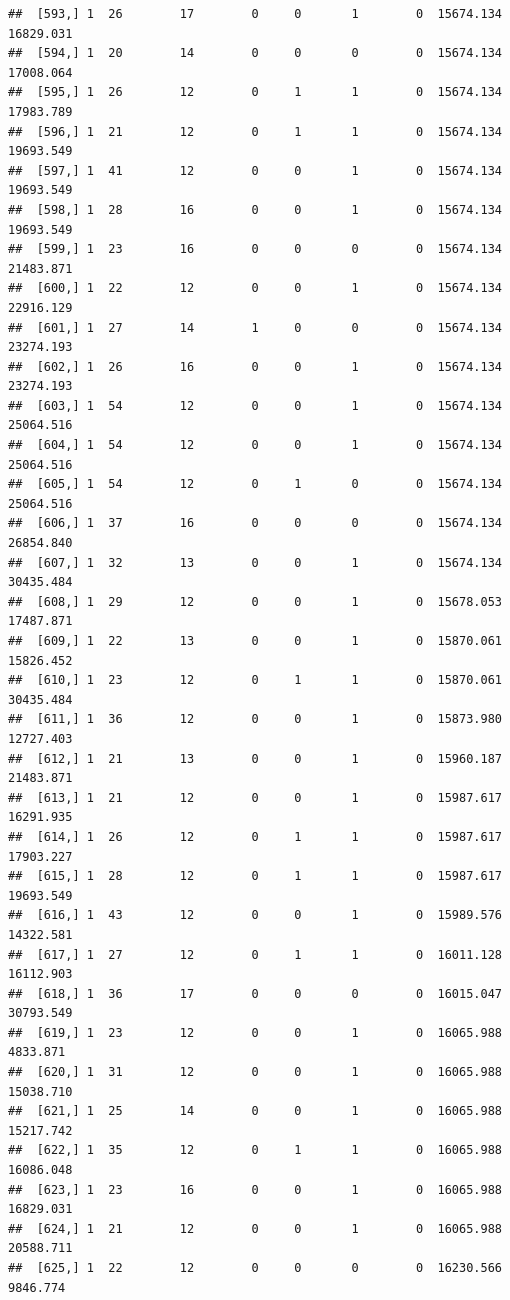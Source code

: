 \documentclass[
]{article}
\begin{document}
\begin{verbatim}
##  [593,] 1  26        17        0     0       1        0  15674.134  16829.031
##  [594,] 1  20        14        0     0       0        0  15674.134  17008.064
##  [595,] 1  26        12        0     1       1        0  15674.134  17983.789
##  [596,] 1  21        12        0     1       1        0  15674.134  19693.549
##  [597,] 1  41        12        0     0       1        0  15674.134  19693.549
##  [598,] 1  28        16        0     0       1        0  15674.134  19693.549
##  [599,] 1  23        16        0     0       0        0  15674.134  21483.871
##  [600,] 1  22        12        0     0       1        0  15674.134  22916.129
##  [601,] 1  27        14        1     0       0        0  15674.134  23274.193
##  [602,] 1  26        16        0     0       1        0  15674.134  23274.193
##  [603,] 1  54        12        0     0       1        0  15674.134  25064.516
##  [604,] 1  54        12        0     0       1        0  15674.134  25064.516
##  [605,] 1  54        12        0     1       0        0  15674.134  25064.516
##  [606,] 1  37        16        0     0       0        0  15674.134  26854.840
##  [607,] 1  32        13        0     0       1        0  15674.134  30435.484
##  [608,] 1  29        12        0     0       1        0  15678.053  17487.871
##  [609,] 1  22        13        0     0       1        0  15870.061  15826.452
##  [610,] 1  23        12        0     1       1        0  15870.061  30435.484
##  [611,] 1  36        12        0     0       1        0  15873.980  12727.403
##  [612,] 1  21        13        0     0       1        0  15960.187  21483.871
##  [613,] 1  21        12        0     0       1        0  15987.617  16291.935
##  [614,] 1  26        12        0     1       1        0  15987.617  17903.227
##  [615,] 1  28        12        0     1       1        0  15987.617  19693.549
##  [616,] 1  43        12        0     0       1        0  15989.576  14322.581
##  [617,] 1  27        12        0     1       1        0  16011.128  16112.903
##  [618,] 1  36        17        0     0       0        0  16015.047  30793.549
##  [619,] 1  23        12        0     0       1        0  16065.988   4833.871
##  [620,] 1  31        12        0     0       1        0  16065.988  15038.710
##  [621,] 1  25        14        0     0       1        0  16065.988  15217.742
##  [622,] 1  35        12        0     1       1        0  16065.988  16086.048
##  [623,] 1  23        16        0     0       1        0  16065.988  16829.031
##  [624,] 1  21        12        0     0       1        0  16065.988  20588.711
##  [625,] 1  22        12        0     0       0        0  16230.566   9846.774

\end{verbatim}
\end{document}
